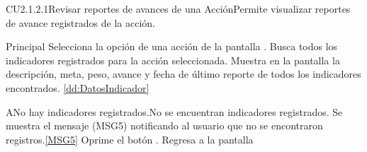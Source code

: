 
	\begin{UseCase}{CU2.1.2.1}{Revisar reportes de avances de una Acción}{Permite visualizar reportes de avance registrados de la acción.}
	\end{UseCase}
	
	
	\begin{UCtrayectoria}{Principal}
		\UCpaso[\UCactor] Selecciona la opción  de una acción de la pantalla .
		\UCpaso Busca todos los indicadores registrados para la acción seleccionada.
		\UCpaso Muestra en la pantalla  la descripción, meta, peso, avance y fecha de último reporte de todos los indicadores encontrados.  \ref{dd:DatosIndicador}
		
	\end{UCtrayectoria}
	
		\begin{UCtrayectoriaA}{A}{No hay indicadores registrados.}{No se encuentran indicadores registrados.}
			\UCpaso Se muestra el mensaje (MSG5) notificando al usuario que no se encontraron registros.\ref{MSG5}
			\UCpaso[\UCactor] Oprime el botón .
			\UCpaso Regresa a la pantalla 
		\end{UCtrayectoriaA}

